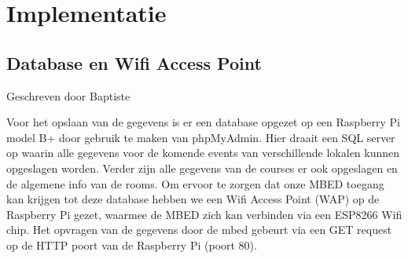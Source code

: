 \documentclass[a4paper,kul]{kulakarticle} %
\begin{document}
\newpage

\section{Implementatie}
\subsection{Database en Wifi Access Point} 
{\scriptsize Geschreven door Baptiste}
\newline

Voor het opslaan van de gegevens is er een database opgezet op een Raspberry Pi model B+ door gebruik te maken van phpMyAdmin. Hier draait een SQL server op waarin alle gegevens voor de komende events van verschillende lokalen kunnen opgeslagen worden. Verder zijn alle gegevens van de courses er ook opgeslagen en de algemene info van de rooms. Om ervoor te zorgen dat onze MBED toegang kan krijgen tot deze database hebben we een Wifi Access Point (WAP) op de Raspberry Pi gezet, waarmee de MBED zich kan verbinden via een ESP8266 Wifi chip. Het opvragen van de gegevens door de mbed gebeurt via een GET request op de HTTP poort van de Raspberry Pi (poort 80).
 
\end{document}
